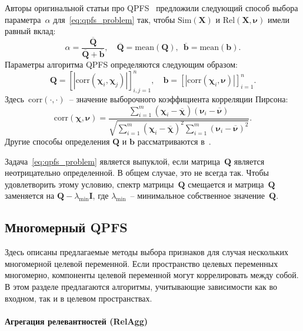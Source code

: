\documentclass[preprint,12pt]{elsarticle}
\theoremstyle{definition}
\newcommand{\bb}{\mathbf{b}}
\newcommand{\bX}{\mathbf{X}}
\newcommand{\bQ}{\mathbf{Q}}
\newcommand{\bchi}{\boldsymbol{\chi}}
\newcommand{\bnu}{\boldsymbol{\nu}}
\begin{document}
Авторы оригинальной статьи про QPFS~\cite{rodriguez2010quadratic} предложили следующий способ выбора параметра~$\alpha$ для~\eqref{eq:qpfs_problem} так, чтобы $\text{Sim}(\bX)$ и $\text{Rel}(\bX, \bnu)$ имели равный вклад:
\begin{equation*}
\alpha = \frac{\overline{\bQ}}{\overline{\bQ} + \overline{\bb}}, \quad \overline{\bQ} = \text{mean} (\bQ), \,\,\, \overline{\bb}= \text{mean} (\bb).
\end{equation*}
Параметры алгоритма QPFS определяются следующим образом:
\begin{equation}
\bQ = \left[|\text{corr}(\bchi_i, \bchi_j)|\right]_{i,j=1}^n, \quad \bb = \left[|\text{corr}(\bchi_i, \bnu)|\right]_{i=1}^n.
\label{eq:qpfs_1d_qb}
\end{equation}
Здесь~$\text{corr}(\cdot, \cdot)$~-- значение выборочного коэффициента корреляции Пирсона:
\begin{equation*}
\text{corr}(\bchi, \bnu) = \frac{\sum_{i=1}^m(\bchi_i - \overline{\bchi})( \bnu_i - \overline{\bnu})}{\sqrt{\sum_{i=1}^m(\bchi_i - \overline{\bchi})^2\sum_{i=1}^m(\bnu_i - \overline{\bnu})^2}}.
\end{equation*}
Другие способы определения $\bQ$ и $\bb$ рассматриваются в~\cite{katrutsa2017comprehensive}.

Задача~\eqref{eq:qpfs_problem} является выпуклой, если матрица~$\bQ$ является неотрицательно определенной. В общем случае, это не всегда так.
Чтобы удовлетворить этому условию, спектр матрицы~$\bQ$ смещается и матрица~$\bQ$ заменяется на $\bQ - \lambda_{\text{min}} \mathbf{I}$, где $\lambda_{\text{min}}$~-- минимальное собственное значение~$\bQ$.

\subsection{Многомерный QPFS}

Здесь описаны предлагаемые методы выбора признаков для случая нескольких многомерной целевой переменной.
Если пространство целевых переменных многомерно, компоненты целевой переменной могут коррелировать между собой. 
В этом разделе предлагаются алгоритмы, учитывающие зависимости как во входном, так и в целевом пространствах.

\paragraph{Агрегация релевантностей (RelAgg)}
\end{document}
